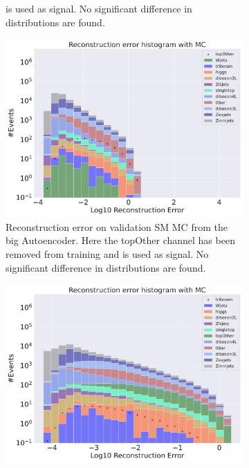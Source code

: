 \begin{figure}[H]
\begin{subfigure}{.45\textwidth}
{        is used as signal. No significant difference in distributions are found. }
        \label{fig:ae_small_topOther}
    \end{subfigure}
    \hfill
    \begin{subfigure}{.45\textwidth}
        \includegraphics[width=\textwidth]{Figures/AE_testing/big/b_data_recon_big_rm3_feats_sig_topOther.pdf}
        \caption{Reconstruction error on validation SM MC from the big Autoencoder. Here the topOther channel has been removed from training and 
        is used as signal. No significant difference in distributions are found. }
        \label{fig:ae_big_topOther}
    \end{subfigure}
    \hfill
    \begin{subfigure}{.45\textwidth}
        \includegraphics[width=\textwidth]{Figures/AE_testing/small/b_data_recon_big_rm3_feats_sig_triboson.pdf}

\end{subfigure}
\end{figure}
